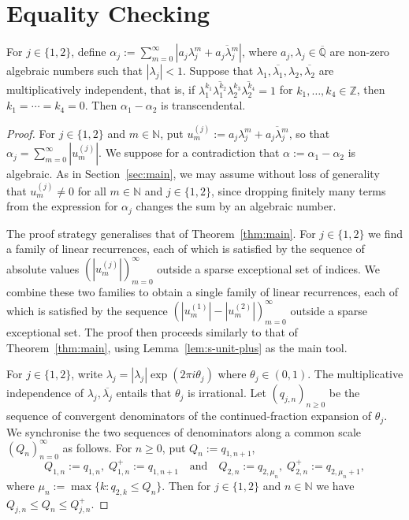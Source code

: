 \documentclass[a4paper,UKenglish,cleveref, autoref, thm-restate]{lipics-v2021}
\begin{document}
\section{Equality Checking}
\begin{theorem} For $j\in \{1,2\}$, define $\alpha_j:=\sum_{m=0}^\infty |a_j \lambda_j^m+\overline{a_j\lambda_j^m}|$,
where $a_j,\lambda_j \in \overline{\mathbb{Q}}$ are non-zero algebraic numbers
such that $|\lambda_j|<1$. 
Suppose that $\lambda_1,\overline{\lambda_1},\lambda_2,\overline{\lambda_2}$ are multiplicatively independent, that is,
if $\lambda_1^{k_1}\overline{\lambda_1^{k_2}}\lambda_2^{k_3}\overline{\lambda_2^{k_4}}=1$ for $k_1,\ldots,k_4\in \mathbb Z$, then
$k_1=\cdots=k_4=0$.
Then $\alpha_1-\alpha_2$ is 
transcendental. \label{thm:LI} \end{theorem}
\begin{proof}

For \(j\in\{1,2\}\) and \(m\in\mathbb N\), put $u_m^{(j)}:=a_j \lambda_j^m+\overline{a_j\lambda_j^m}$, so that
\(  \alpha_j=\sum_{m=0}^{\infty}|u_m^{(j)}| \).  
We suppose for a contradiction that \(\alpha:=\alpha_1-\alpha_2\) is algebraic.
As in Section~\ref{sec:main},
we may assume without loss of generality that \(u_m^{(j)}\neq 0\) for all $m\in\mathbb N$
and $j\in \{1,2\}$, since dropping finitely many terms from the expression for $\alpha_j$ changes the sum by an algebraic number.

The proof strategy generalises that of Theorem~\ref{thm:main}.
For $j\in\{1,2\}$ we find a family of linear recurrences, each of which is satisfied 
by the sequence of absolute values
$(|u_m^{(j)}|)_{m=0}^\infty$ outside a sparse exceptional set of indices.  We combine these two families to obtain a single family of linear recurrences,
each of which is satisfied by the sequence $(|u^{(1)}_m|-|u_m^{(2)}|)_{m=0}^\infty$ outside a sparse exceptional set.  The proof then  proceeds similarly to that of 
Theorem~\ref{thm:main}, using Lemma~\ref{lem:s-unit-plus} as the main tool.

For \(j\in\{1,2\}\), write \(  \lambda_j=|\lambda_j|\exp(2\pi i\theta_j)\)
  where $\theta_j\in(0,1)$.   
The multiplicative independence of
\(  \lambda_j,\overline{\lambda_j}\) entails that $\theta_j$ is irrational.
Let
\((q_{j,n})_{n\ge0}\)
be the sequence of convergent denominators of the continued-fraction
expansion of \(\theta_j\).  
We synchronise the two sequences of
denominators along a common scale $(Q_n)_{n=0}^\infty$ as follows. For \(n\ge0\), put $Q_n:=q_{1,n+1}$, 
\[ Q_{1,n}:=q_{1,n},\; Q_{1,n}^+:=q_{1,n+1}\quad\text{and}\quad Q_{2,n}:=q_{2,\mu_n},\; Q_{2,n}^+:= q_{2,\mu_n+1},\]
where $\mu_n:=\max\{k:q_{2,k}\leq Q_n\}$.
Then for $j\in \{1,2\}$ and $n\in \mathbb N$ we have
\(Q_{j,n}\le Q_n \le Q^+_{j,n}\).


\end{proof}
\end{document}
